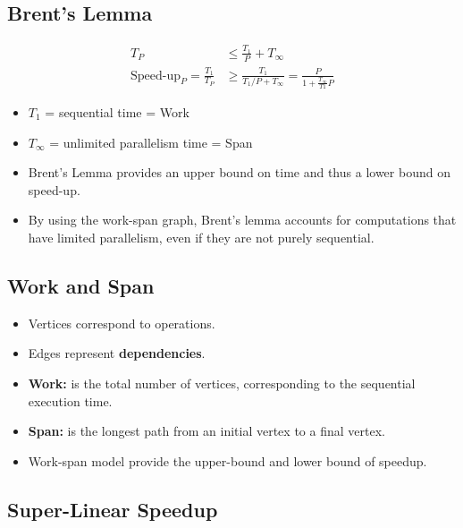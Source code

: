 \documentclass[../main.tex]{subfiles}
\begin{document}
\subsection{Brent's Lemma}

\begin{align*}
	T_P                                       & \leq \frac{T_{1}}{P} + T_\infty                                               \\
	\text{Speed-up}_{P} = \frac{T_{1}}{T_{P}} & \geq \frac{T_{1}}{T_{1} / P + T_\infty} = \frac{P}{1 + \frac{T_\infty}{T1} P}
\end{align*}

\begin{itemize}
	\item \(T_1\) = sequential time = Work
	\item \(T_\infty\) = unlimited parallelism time = Span
	\item Brent's Lemma provides an upper bound on time and thus a lower bound on speed-up.
	\item By using the work-span graph, Brent’s lemma accounts for computations that have limited parallelism, even if they are not purely sequential.
\end{itemize}

\subsection{Work and Span}

\begin{itemize}
	\item Vertices correspond to operations.
	\item Edges represent \textbf{dependencies}.
	\item \textbf{Work:} is the total number of vertices, corresponding to the sequential execution time.
	\item \textbf{Span:} is the longest path from an initial vertex to a final vertex.
	\item Work-span model provide the upper-bound and lower bound of speedup.
\end{itemize}

\subsection{Super-Linear Speedup}
\end{document}
